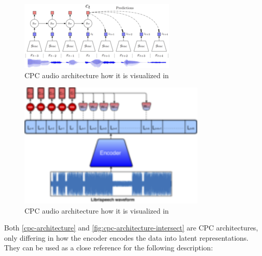\begin{figure}[h]
	\includegraphics[width=\textwidth]{bilder/Audio-Architecture.png}
	\caption{CPC audio architecture how it is visualized in \autocite{DBLP:journals/corr/abs-1807-03748}}
	\label{cpc-architecture}
	\centering
\end{figure}

\begin{figure}[h]
	\centering
	\includegraphics[width=0.8\textwidth]{bilder/CPC-correct-architecture.png}
	\caption{CPC audio architecture how it is visualized in \autocite{lai2019contrastive}}
	\label{fig:cpc-architecture-intersect}
\end{figure}

Both \autoref{cpc-architecture} and \autoref{fig:cpc-architecture-intersect} are CPC architectures, only differing in how the encoder encodes the data into latent representations. They can be used as a close reference for the following description:


